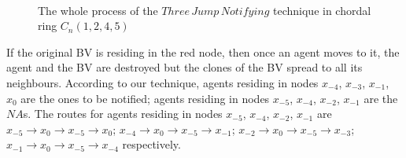 \begin{figure} [H]
  \centering 
  \hspace{1in} 
   \
  \hspace{1in} 
  \hspace{1in} 
  \caption{The whole process of the $Three\,Jump\,Notifying$ technique in chordal ring $C_n(1, 2, 4, 5)$} 
  \label{fig:subfig} %
\end{figure}




If the original BV is residing in the red node, then once an agent moves to it, the agent and the BV are destroyed but the clones of the BV spread to all its neighbours. According to our technique, 
agents residing in nodes $x_{-4}$, $x_{-3}$, $x_{-1}$, $x_0$ are the  ones to be notified; 
agents residing in nodes $x_{-5}$, $x_{-4}$, $x_{-2}$, $x_{-1}$ are the $NA$s.
 The routes for agents residing in nodes $x_{-5}$, $x_{-4}$, $x_{-2}$, $x_{-1}$ are $x_{-5}{\rightarrow}x_0{\rightarrow}x_{-5}{\rightarrow}x_0$; $x_{-4}{\rightarrow}x_0{\rightarrow}x_{-5}{\rightarrow}x_{-1}$; $x_{-2}{\rightarrow}x_0{\rightarrow}x_{-5}{\rightarrow}x_{-3}$; $x_{-1}{\rightarrow}x_0{\rightarrow}x_{-5}{\rightarrow}x_{-4}$ respectively.\\

